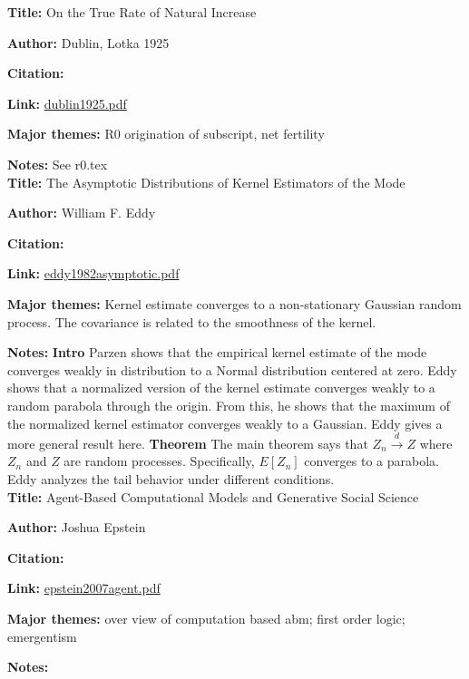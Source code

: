 \message{ !name(refs.tex)}\documentclass{article}
\begin{document}
\textbf{Title:}  On the True Rate of Natural Increase 

\textbf{Author:} Dublin, Lotka 1925

\textbf{Citation:}\cite{dublin1925}

\textbf{Link:} \url{dublin1925.pdf}

\textbf{Major themes:}  R0 origination of subscript, net fertility

\textbf{Notes:}  See r0.tex
\\

\textbf{Title:} The Asymptotic Distributions of Kernel Estimators of the Mode

\textbf{Author:}  William F. Eddy

\textbf{Citation:} \cite{eddy1982asymptotic}

\textbf{Link:} \url{eddy1982asymptotic.pdf}

\textbf{Major themes:}  Kernel estimate converges to a non-stationary Gaussian random process.  The covariance is related to the smoothness of the kernel.

\textbf{Notes:}  
\textbf{Intro}  Parzen shows that the empirical kernel estimate of the mode converges weakly in distribution to a Normal distribution centered at zero.  Eddy shows that a normalized version of the kernel estimate converges weakly to a random parabola through the origin.  From this, he shows that the maximum of the normalized kernel estimator converges weakly to a Gaussian.  Eddy gives a more general result here.
\textbf{Theorem}  The main theorem says that $Z_n \overset{d}{\to} Z$ where $Z_n$ and $Z$ are random processes.  Specifically, $E[Z_n]$ converges to a parabola.
Eddy analyzes the tail behavior under different conditions.
\\

\textbf{Title:} Agent-Based Computational Models and Generative Social Science

\textbf{Author:} Joshua Epstein

\textbf{Citation:} \cite{epstein2007agent}

\textbf{Link:} \url{epstein2007agent.pdf}

\textbf{Major themes:} over view of computation based abm; first order logic; emergentism

\textbf{Notes:} 
\end{document}

